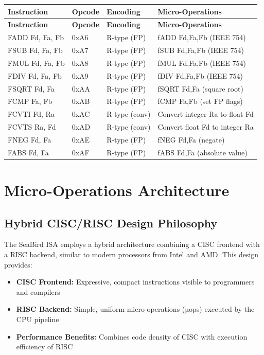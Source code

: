 \documentclass[12pt]{article}
\begin{document}
\begin{longtable}{@{}L{2.8cm}L{1.5cm}L{1.7cm}L{4.5cm}@{}}
\toprule
\textbf{Instruction} & \textbf{Opcode} & \textbf{Encoding} & \textbf{Micro-Operations} \\ \midrule
\endfirsthead
\toprule
\textbf{Instruction} & \textbf{Opcode} & \textbf{Encoding} & \textbf{Micro-Operations} \\ \midrule
\endhead
FADD Fd, Fa, Fb & 0xA6 & R-type (FP) & fADD Fd,Fa,Fb (IEEE 754) \\
FSUB Fd, Fa, Fb & 0xA7 & R-type (FP) & fSUB Fd,Fa,Fb (IEEE 754) \\
FMUL Fd, Fa, Fb & 0xA8 & R-type (FP) & fMUL Fd,Fa,Fb (IEEE 754) \\
FDIV Fd, Fa, Fb & 0xA9 & R-type (FP) & fDIV Fd,Fa,Fb (IEEE 754) \\
FSQRT Fd, Fa & 0xAA & R-type (FP) & fSQRT Fd,Fa (square root) \\
FCMP Fa, Fb & 0xAB & R-type (FP) & fCMP Fa,Fb (set FP flags) \\
FCVTI Fd, Ra & 0xAC & R-type (conv) & Convert integer Ra to float Fd \\
FCVTS Ra, Fd & 0xAD & R-type (conv) & Convert float Fd to integer Ra \\
FNEG Fd, Fa & 0xAE & R-type (FP) & fNEG Fd,Fa (negate) \\
FABS Fd, Fa & 0xAF & R-type (FP) & fABS Fd,Fa (absolute value) \\ \bottomrule
\end{longtable}

\section{Micro-Operations Architecture}

\subsection{Hybrid CISC/RISC Design Philosophy}

The SeaBird ISA employs a hybrid architecture combining a CISC frontend with a RISC backend, similar to modern processors from Intel and AMD. This design provides:

\begin{itemize}
    \item \textbf{CISC Frontend:} Expressive, compact instructions visible to programmers and compilers
    \item \textbf{RISC Backend:} Simple, uniform micro-operations (µops) executed by the CPU pipeline
    \item \textbf{Performance Benefits:} Combines code density of CISC with execution efficiency of RISC
\end{itemize}
\end{document}
